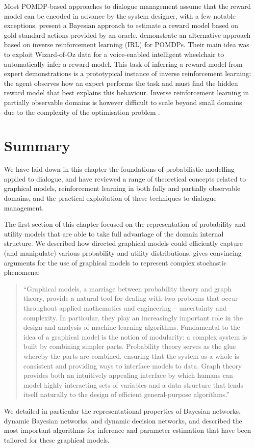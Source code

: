 Most POMDP-based approaches to dialogue management assume that the reward model can be encoded in advance by the system designer, with a few notable exceptions. \cite{DBLP:conf/iui/AtrashP09} present a Bayesian approach to estimate a reward model based on gold standard actions provided by an oracle. \cite{boularias2010,ChinaeiC12} demonstrate an alternative approach based on inverse reinforcement learning (IRL) for POMDPs. Their main idea was to exploit Wizard-of-Oz data for a voice-enabled intelligent wheelchair to automatically infer a reward model.  This task of inferring a reward model from expert demonstrations is a prototypical instance of inverse reinforcement learning: the agent observes how an expert performs the task and must find the hidden reward model that best explains this behaviour.  Inverse reinforcement learning in partially observable domains is however difficult to scale beyond small domains due to the complexity of the optimisation problem \citep{Choi:2011}. 

\section{Summary}

We have laid down in this chapter the foundations of probabilistic modelling applied to dialogue, and have reviewed a range of theoretical concepts related to graphical models, reinforcement learning in both fully and partially observable domains, and the practical exploitation of these techniques to dialogue management. 

The first section of this chapter focused on the representation of probability and utility models that are able to take full advantage of the domain internal structure.  We described how directed graphical models could efficiently capture (and manipulate) various probability and utility distributions. \citet[][p. 1]{jordan1998} gives convincing arguments for the use of graphical models to represent complex stochastic phenomena: 
\begin{quote}
 ``Graphical models, a marriage between probability theory and graph theory, provide a natural tool for dealing with two problems that occur throughout applied mathematics and engineering -- uncertainty and complexity. In particular, they play an increasingly important role in the design and analysis of machine learning algorithms. Fundamental to the idea of a graphical model is the notion of modularity: a complex system is built by combining simpler parts. Probability theory serves as the glue whereby the parts are combined, ensuring that the system as a whole is consistent and providing ways to interface models to data. Graph theory provides both an intuitively appealing interface by which humans can model highly interacting sets of variables and a data structure that lends itself naturally to the design of efficient general-purpose algorithms.''
 \end{quote}
We detailed in particular the representational properties of Bayesian networks, dynamic Bayesian networks, and dynamic decision networks, and described the most important algorithms for inference and parameter estimation that have been tailored for these graphical models.

